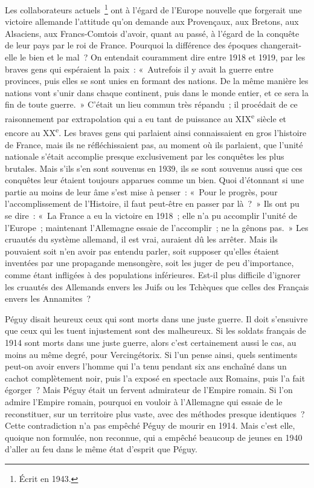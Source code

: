 \documentclass[french,twoside]{book} %
\begin{document}
Les collaborateurs actuels \footnote{Écrit en 1943.} ont à l'égard de l'Europe nouvelle que forgerait une victoire allemande l'attitude qu'on demande aux Provençaux, aux Bretons, aux Alsaciens, aux Francs-Comtois d'avoir, quant au passé, à l'égard de la conquête de leur pays par le roi de France. Pourquoi la différence des époques changerait-elle le bien et le mal ? On entendait couramment dire entre 1918 et 1919, par les braves gens qui espéraient la paix : « Autrefois il y avait la guerre entre provinces, puis elles se sont unies en formant des nations. De la même manière les nations vont s'unir dans chaque continent, puis dans le monde entier, et ce sera la fin de toute guerre. » C'était un lieu commun très répandu ; il procédait de ce raisonnement par extrapolation qui a eu tant de puissance au XIX\textsuperscript{e} siècle et encore au XX\textsuperscript{e}. Les braves gens qui parlaient ainsi connaissaient en gros l'histoire de France, mais ils ne réfléchissaient pas, au moment où ils parlaient, que l'unité nationale s'était accomplie presque exclusivement par les conquêtes les plus brutales. Mais s'ils s'en sont souvenus en 1939, ils se sont souvenus aussi que ces conquêtes leur étaient toujours apparues comme un bien. Quoi d'étonnant si une partie au moins de leur âme s'est mise à penser : « Pour le progrès, pour l'accomplissement de l'Histoire, il faut peut-être en passer par là ? » Ils ont pu se dire : « La France a eu la victoire en 1918 ; elle n'a pu accomplir l'unité de l'Europe ; maintenant l'Allemagne essaie de l'accomplir ; ne la gênons pas. » Les cruautés du système allemand, il est vrai, auraient dû les arrêter. Mais ils pouvaient soit n'en avoir pas entendu parler, soit supposer qu'elles étaient inventées par une propagande mensongère, soit les juger de peu d'importance, comme étant infligées à des populations inférieures. Est-il plus difficile d'ignorer les cruautés des Allemands envers les Juifs ou les Tchèques que celles des Français envers les Annamites ?\par
Péguy disait heureux ceux qui sont morts dans une juste guerre. Il doit s'ensuivre que ceux qui les tuent injustement sont des malheureux. Si les soldats français de 1914 sont morts dans une juste guerre, alors c'est certainement aussi le cas, au moins au même degré, pour Vercingétorix. Si l’un pense ainsi, quels sentiments peut-on avoir envers l'homme qui l'a tenu pendant six ans enchaîné dans un cachot complètement noir, puis l'a exposé en spectacle aux Romains, puis l'a fait égorger ? Mais Péguy était un fervent admirateur de l'Empire romain. Si l'on admire l'Empire romain, pourquoi en vouloir à l'Allemagne qui essaie de le reconstituer, sur un territoire plus vaste, avec des méthodes presque identiques ? Cette contradiction n'a pas empêché Péguy de mourir en 1914. Mais c'est elle, quoique non formulée, non reconnue, qui a empêché beaucoup de jeunes en 1940 d'aller au feu dans le même état d'esprit que Péguy.\par
\end{document}
